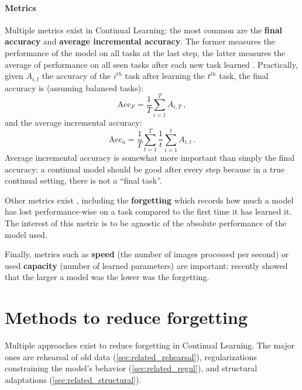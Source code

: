 \paragraph{Metrics} Multiple metrics exist in Continual Learning: the most common are the \textbf{final accuracy} and
\textbf{average incremental accuracy}. The former measures the performance of the model on all tasks
at the last step, the latter measures the average of performance on all seen tasks after each new
task learned \citep{rebuffi2017icarl}. Practically, given $A_{i,t}$ the accuracy of the $i^{th}$
task after
learning the $t^{th}$ task, the final accuracy is (assuming balanced tasks):
%
\begin{equation}
      \text{Acc}_F = \frac{1}{T} \sum_{i=1}^T A_{i,T}\,,
      \label{eq:related_final_acc}
\end{equation}
%
and the average incremental accuracy:
%
\begin{equation}
      \text{Acc}_a = \frac{1}{T} \sum_{t=1}^T \frac{1}{t}  \sum_{i=1}^t A_{i,t}\,.
      \label{eq:related_avg_acc}
\end{equation}
%
Average incremental accuracy is somewhat more important than simply the final accuracy: a continual
model should be good after every step because in a true continual setting, there is not a ``final
task''.

Other metrics exist \citep{diaz2018continualmetrics}, including the \textbf{forgetting}
\citep{chaudhry2018riemannien_walk} which records how much a model has lost performance-wise on a
task compared to the first time it has learned it. The interest of this metric is to be agnostic of
the absolute performance of the model used.

Finally, metrics such as \textbf{speed} (\ie the number of images processed per second) or used
\textbf{capacity} (\ie number of learned parameters) are important:
\cite{ramasesh2022scalecontinual} recently showed that the larger a model was the lower was the
forgetting.

\section{Methods to reduce forgetting}
\label{sec:related_methods}

Multiple approaches exist to reduce forgetting in Continual Learning. The major ones are
rehearsal of old data (\autoref{sec:related_rehearsal}), regularizations constraining the model's
behavior (\autoref{sec:related_regul}), and structural adaptations (\autoref{sec:related_structural}).

